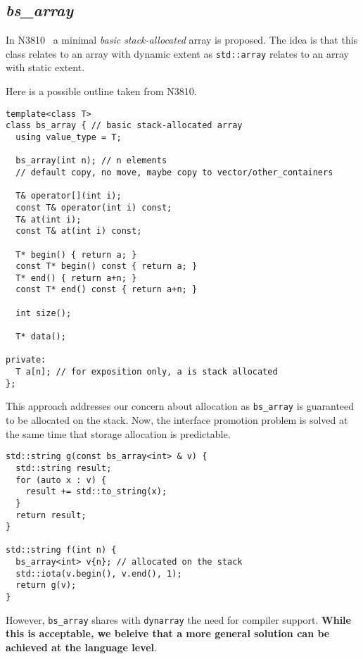 \subsection{\emph{bs\_array}}

In N3810~\cite{n3810} a minimal \emph{basic stack-allocated} array is proposed.
The idea is that this class relates to an array with dynamic extent as
\verb+std::array+ relates to an array with static extent.

Here is a possible outline taken from N3810.

\begin{lstlisting}
template<class T>
class bs_array { // basic stack-allocated array
  using value_type = T;

  bs_array(int n); // n elements
  // default copy, no move, maybe copy to vector/other_containers

  T& operator[](int i); 
  const T& operator(int i) const; 
  T& at(int i); 
  const T& at(int i) const; 

  T* begin() { return a; } 
  const T* begin() const { return a; }
  T* end() { return a+n; }
  const T* end() const { return a+n; }

  int size();

  T* data();

private:
  T a[n]; // for exposition only, a is stack allocated
};
\end{lstlisting}

This approach addresses our concern about allocation as \verb+bs_array+ is
guaranteed to be allocated on the stack. Now, the interface promotion problem is
solved at the same time that storage allocation is predictable.

\begin{lstlisting}
std::string g(const bs_array<int> & v) {
  std::string result;
  for (auto x : v) {
    result += std::to_string(x);
  }
  return result;
}

std::string f(int n) {
  bs_array<int> v{n}; // allocated on the stack
  std::iota(v.begin(), v.end(), 1);
  return g(v);
}
\end{lstlisting}



However, \verb+bs_array+ shares with \verb+dynarray+ the need for compiler
support. \textbf{While this is acceptable, we beleive that a more general
solution can be achieved at the language level}.
